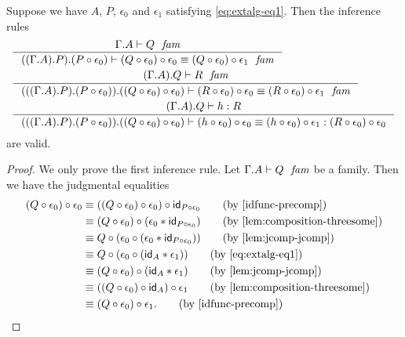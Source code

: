 \begin{lem}\label{lem:extalg-twins}
Suppose we have $A$, $P$, $\epsilon_0$ and $\epsilon_1$ satisfying \autoref{eq:extalg-eq1}. Then
the inference rules
\begin{align*}
& \inference
  { \jfam{{\Gamma}{A}}{Q}
    }
  { \jfameq
      {{{{\Gamma}{A}}{P}}{\jcomp{}{\epsilon_0}{P}}}
      {\jcomp{}{\epsilon_0}{\jcomp{}{\epsilon_0}{Q}}}
      {\jcomp{}{\epsilon_1}{\jcomp{}{\epsilon_0}{Q}}}
    }
  \\
& \inference
  { \jfam{{{\Gamma}{A}}{Q}}{R}
    }
  { \jfameq
      {{{{{\Gamma}{A}}{P}}{\jcomp{}{\epsilon_0}{P}}}
        {\jcomp{}{\epsilon_0}{\jcomp{}{\epsilon_0}{Q}}}}
      {\jcomp{}{\epsilon_0}{\jcomp{}{\epsilon_0}{R}}}
      {\jcomp{}{\epsilon_1}{\jcomp{}{\epsilon_0}{R}}}
    }
  \\
& \inference
  { \jterm{{{\Gamma}{A}}{Q}}{R}{h}
    }
  { \jtermeq
      {{{{{\Gamma}{A}}{P}}{\jcomp{}{\epsilon_0}{P}}}
        {\jcomp{}{\epsilon_0}{\jcomp{}{\epsilon_0}{Q}}}}
      {\jcomp{}{\epsilon_0}{\jcomp{}{\epsilon_0}{R}}}
      {\jcomp{}{\epsilon_0}{\jcomp{}{\epsilon_0}{h}}}
      {\jcomp{}{\epsilon_1}{\jcomp{}{\epsilon_0}{h}}}
    }
\end{align*}
are valid.
\end{lem}

\begin{proof}
We only prove the first inference rule. Let $\jfam{{\Gamma}{A}}{Q}$ be a family.
Then we have the judgmental equalities
\begin{align*}
\jcomp{}{\epsilon_0}{\jcomp{}{\epsilon_0}{Q}}
& \jdeq
  \jcomp{}{\idtm{\jcomp{}{\epsilon_0}{P}}}{\jcomp{}{\epsilon_0}{\jcomp{}{\epsilon_0}{Q}}}
  \tag{by \autoref{idfunc-precomp}}
  \\
& \jdeq
  \jcomp{}{\jvcomp{}{\epsilon_0}{\idtm{\jcomp{}{\epsilon_0}{P}}}}{\jcomp{}{\epsilon_0}{Q}}
  \tag{by \autoref{lem:composition-threesome}}
  \\
& \jdeq
  \jcomp{}{\jcomp{}{\jvcomp{}{\epsilon_0}{\idtm{\jcomp{}{\epsilon_0}{P}}}}{\epsilon_0}}{Q}
  \tag{by \autoref{lem:jcomp-jcomp}}
  \\
& \jdeq
  \jcomp{}{\jcomp{}{\jvcomp{}{\idtm{A}}{\epsilon_1}}{\epsilon_0}}{Q}
  \tag{by \autoref{eq:extalg-eq1}}
  \\
& \jdeq
  \jcomp{}{\jvcomp{}{\idtm{A}}{\epsilon_1}}{\jcomp{}{\epsilon_0}{Q}}
  \tag{by \autoref{lem:jcomp-jcomp}}
  \\
& \jdeq
  \jcomp{}{\epsilon_1}{\jcomp{}{\idtm{A}}{\jcomp{}{\epsilon_0}{Q}}}
  \tag{by \autoref{lem:composition-threesome}}
  \\
& \jdeq
  \jcomp{}{\epsilon_1}{\jcomp{}{\epsilon_0}{Q}}.
  \tag{by \autoref{idfunc-precomp}}
\end{align*}
\end{proof}

